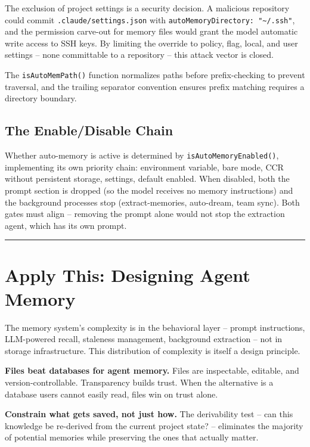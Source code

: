 \documentclass[
  english,
  11pt,
  letterpaper,
]{book}
\begin{document}
The exclusion of project settings is a security decision. A malicious
repository could commit \texttt{.claude/settings.json} with
\texttt{autoMemoryDirectory:\ "\textasciitilde{}/.ssh"}, and the
permission carve-out for memory files would grant the model automatic
write access to SSH keys. By limiting the override to policy, flag,
local, and user settings -- none committable to a repository -- this
attack vector is closed.

The \texttt{isAutoMemPath()} function normalizes paths before
prefix-checking to prevent traversal, and the trailing separator
convention ensures prefix matching requires a directory boundary.

\subsection{The Enable/Disable Chain}\label{the-enabledisable-chain}

Whether auto-memory is active is determined by
\texttt{isAutoMemoryEnabled()}, implementing its own priority chain:
environment variable, bare mode, CCR without persistent storage,
settings, default enabled. When disabled, both the prompt section is
dropped (so the model receives no memory instructions) and the
background processes stop (extract-memories, auto-dream, team sync).
Both gates must align -- removing the prompt alone would not stop the
extraction agent, which has its own prompt.

\begin{center}\rule{0.5\linewidth}{0.5pt}\end{center}

\section{Apply This: Designing Agent
Memory}\label{apply-this-designing-agent-memory}

The memory system's complexity is in the behavioral layer -- prompt
instructions, LLM-powered recall, staleness management, background
extraction -- not in storage infrastructure. This distribution of
complexity is itself a design principle.

\textbf{Files beat databases for agent memory.} Files are inspectable,
editable, and version-controllable. Transparency builds trust. When the
alternative is a database users cannot easily read, files win on trust
alone.

\textbf{Constrain what gets saved, not just how.} The derivability test
-- can this knowledge be re-derived from the current project state? --
eliminates the majority of potential memories while preserving the ones
that actually matter.
\end{document}
